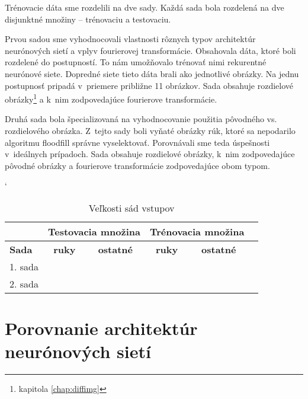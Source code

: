 Trénovacie dáta sme rozdelili na dve sady. Každá sada bola rozdelená na dve disjunktné množiny -- trénovaciu a testovaciu. 

Prvou sadou sme vyhodnocovali vlastnosti rôznych typov architektúr neurónových sietí a vplyv fourierovej transformácie. Obsahovala dáta, ktoré boli rozdelené do postupností. To nám umožňovalo trénovať nimi rekurentné neurónové siete. Dopredné siete tieto dáta brali ako jednotlivé obrázky. Na jednu postupnosť pripadá v~priemere približne 11 obrázkov. Sada obsahuje rozdielové obrázky\footnote{kapitola \ref{chap:diffimg}} a k~nim zodpovedajúce fourierove transformácie.

Druhá sada bola špecializovaná na vyhodnocovanie použitia pôvodného vs. rozdielového obrázka. Z~tejto sady boli vyňaté obrázky rúk, ktoré sa nepodarilo algoritmu floodfill správne vyselektovať. Porovnávali sme teda úspešnosti v~ideálnych prípadoch. Sada obsahuje rozdielové obrázky, k~nim zodpovedajúce pôvodné obrázky a fourierove transformácie zodpovedajúce obom typom.

\begin{table}[h]
\catcode` %
\centering
\begin{tabular}{|l|c|c|c|c|c|}
\cline{2-5}
\multicolumn{1}{l}{} & \multicolumn{2}{|c|}{\textbf{Testovacia množina}} & \multicolumn{2}{c|}{\textbf{Trénovacia množina}}\\ 
\hline
\textbf{Sada} & \textbf{ruky} & \textbf{ostatné} & \textbf{ruky} & \textbf{ostatné} \\ \hline
1. sada & & & & \\ \hline
2. sada & & & & \\ 
\hline
\end{tabular}
\caption{Veľkosti sád vstupov}
\label{tab:neuroncountcmp}
\end{table}

\section{Porovnanie architektúr neurónových sietí}




